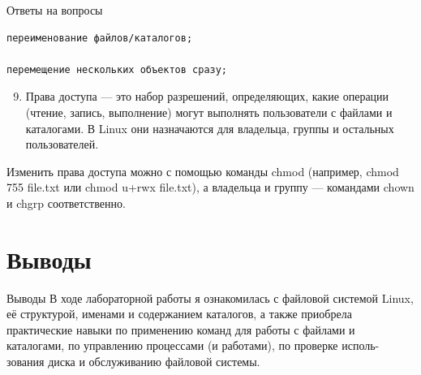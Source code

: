 \documentclass[
  ignorenonframetext,
  aspectratio=169,
  russian,
]{beamer}
\providecommand{\tightlist}{%
  \setlength{\itemsep}{0pt}\setlength{\parskip}{0pt}}
\begin{document}
\begin{frame}[fragile]{Ответы на вопросы}
\begin{verbatim}
переименование файлов/каталогов;

перемещение нескольких объектов сразу;
\end{verbatim}

\begin{enumerate}[<+->]
\setcounter{enumi}{8}
\tightlist
\item
  Права доступа --- это набор разрешений, определяющих, какие операции
  (чтение, запись, выполнение) могут выполнять пользователи с файлами и
  каталогами. В Linux они назначаются для владельца, группы и остальных
  пользователей.
\end{enumerate}

Изменить права доступа можно с помощью команды chmod (например, chmod
755 file.txt или chmod u+rwx file.txt), а владельца и группу ---
командами chown и chgrp соответственно.
\end{frame}

\section{Выводы}\label{ux432ux44bux432ux43eux434ux44b}

\begin{frame}{Выводы}
В ходе лабораторной работы я ознакомилась с файловой системой Linux, её
структурой, именами и содержанием каталогов, а также приобрела
практические навыки по применению команд для работы с файлами и
каталогами, по управлению процессами (и работами), по проверке исполь-
зования диска и обслуживанию файловой системы.
\end{frame}
\end{document}
